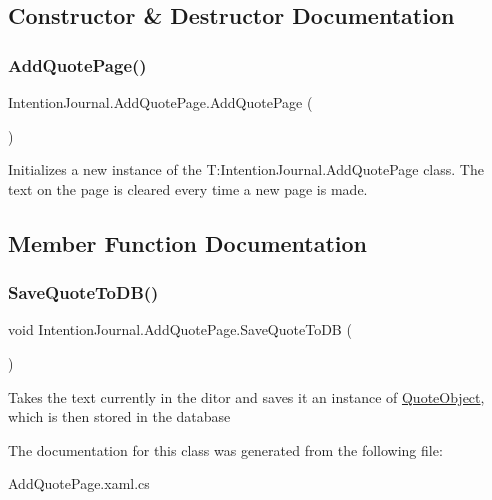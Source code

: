 \subsection{Constructor \& Destructor Documentation}
\mbox{\label{class_intention_journal_1_1_add_quote_page_a0c3a505a6db7cf2098899daf3e379e0b}} 
\subsubsection{\texorpdfstring{Add\+Quote\+Page()}{AddQuotePage()}}
{\footnotesize\ttfamily Intention\+Journal.\+Add\+Quote\+Page.\+Add\+Quote\+Page (\begin{DoxyParamCaption}{ }\end{DoxyParamCaption})\hspace{0.3cm}{\ttfamily [inline]}}



Initializes a new instance of the T\+:\+Intention\+Journal.\+Add\+Quote\+Page class. The text on the page is cleared every time a new page is made. 



\subsection{Member Function Documentation}
\mbox{\label{class_intention_journal_1_1_add_quote_page_a38b02a32de23eb5ab591304dca652ff1}} 
\subsubsection{\texorpdfstring{Save\+Quote\+To\+D\+B()}{SaveQuoteToDB()}}
{\footnotesize\ttfamily void Intention\+Journal.\+Add\+Quote\+Page.\+Save\+Quote\+To\+DB (\begin{DoxyParamCaption}{ }\end{DoxyParamCaption})\hspace{0.3cm}{\ttfamily [inline]}}



Takes the text currently in the ditor and saves it an instance of \hyperlink{class_intention_journal_1_1_quote_object}{Quote\+Object}, which is then stored in the database 



The documentation for this class was generated from the following file\+:\begin{DoxyCompactItemize}
\item 
Add\+Quote\+Page.\+xaml.\+cs\end{DoxyCompactItemize}
